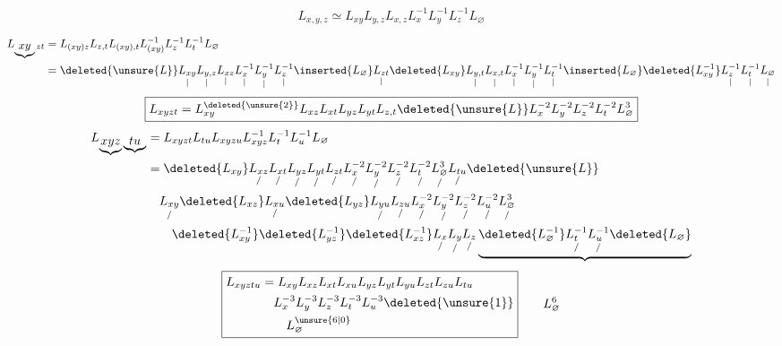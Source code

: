 \[
\boxed{L_{x,y,z}\simeq L_{xy}L_{y,z}L_{x,z}L_x^{-1}L_y^{-1}L_z^{-1}L_{\varnothing}}
\]

\[
\begin{aligned}
L_{\underbrace{xy}zt}
 &=L_{(xy)z}L_{z,t}L_{(xy),t}L_{(xy)}^{-1}L_z^{-1}L_t^{-1}L_{\varnothing}\\
 &=\deleted{\unsure{L}}\underset{|}{L_{xy}}\underset{|}{L_{y,z}}\underset{|}{L_{xz}}
 \underset{|}{L_x^{-1}}\underset{|}{L_y^{-1}}\underset{|}{L_z^{-1}}\inserted{L_{\varnothing}}
 \underset{|}{L_{zt}}\deleted{L_{xy}}\underset{|}{L_{y,t}}\underset{|}{L_{x,t}}
 \underset{|}{L_x^{-1}}\underset{|}{L_y^{-1}}\underset{|}{L_t^{-1}}\inserted{L_{\varnothing}}
 \deleted{L_{xy}^{-1}}\underset{|}{L_z^{-1}}\underset{|}{L_t^{-1}}\underset{|}{L_{\varnothing}}
\end{aligned}
\]
\[
\boxed{L_{xyzt}=L_{xy}^{\deleted{\unsure{2}}}L_{xz}L_{xt}L_{yz}L_{yt}L_{z,t}
\deleted{\unsure{L}}L_x^{-2}L_y^{-2}L_z^{-2}L_t^{-2}L_{\varnothing}^{3}}
\]
\[
\begin{aligned}
L_{\underbrace{xyz}\underbrace{tu}}&=L_{xyzt}L_{tu}L_{xyzu}L_{xyz}^{-1}L_t^{-1}L_u^{-1}L_{\varnothing}\\
&=\deleted{L_{xy}}\underset{/}{L_{xz}}\underset{/}{L_{xt}}\underset{/}{L_{yz}}\underset{/}{L_{yt}}\underset{/}{L_{zt}}\underset{/}{L_x^{-2}}\underset{/}{L_y^{-2}}\underset{/}{L_z^{-2}}\underset{/}{L_t^{-2}}\underset{/}{L_{\varnothing}^3}\underset{/}{L_{tu}}\deleted{\unsure{L}}\\
&\quad \underset{/}{L_{xy}}\deleted{L_{xz}}\underset{/}{L_{xu}}\deleted{L_{yz}}\underset{/}{L_{yu}}\underset{/}{L_{zu}}\underset{/}{L_x^{-2}}\underset{/}{L_y^{-2}}\underset{/}{L_z^{-2}}\underset{/}{L_u^{-2}}\underset{/}{L_{\varnothing}^3}\\
&\qquad \deleted{L_{xy}^{-1}}\deleted{L_{yz}^{-1}}\deleted{L_{xz}^{-1}}\underset{/}{L_x}\underset{/}{L_y}\underset{/}{L_z}
\underbrace{\deleted{L_{\varnothing}^{-1}}\underset{/}{L_t^{-1}}\underset{/}{L_u^{-1}}\deleted{L_{\varnothing}}}
\end{aligned}
\]
\[
\boxed{\begin{aligned}
L_{xyztu}&=L_{xy}L_{xz}L_{xt}L_{xu}L_{yz}L_{yt}L_{yu}L_{zt}L_{zu}L_{tu}\\
&\quad L_x^{-3}L_y^{-3}L_z^{-3}L_t^{-3}L_u^{-3}\deleted{\unsure{1}}\\
&\qquad L_{\varnothing}^{\unsure{6|0}}
\end{aligned}}\qquad L_{\varnothing}^{6}
\]
